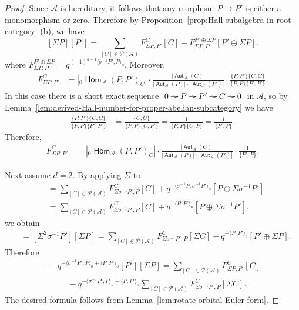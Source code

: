 \documentclass[reqno,12pt,a4paper]{amsart}
\theoremstyle{remark}
\theoremstyle{definition}
\newcommand{\opname}[1]{\operatorname{\mathsf{#1}}}
\newcommand{\Hom}{\opname{Hom}}
\newcommand{\Aut}{\opname{Aut}}
\newcommand{\ca}{{\mathcal A}}
\newcommand{\cp}{{\mathcal P}}
\numberwithin{equation}{section}
\begin{document}
\begin{proof}
Since $\ca$ is hereditary, it follows that any morphism $P\to P'$ is either a monomorphism or zero. Therefore by Proposition~\ref{prop:Hall-subalgebra-in-root-category} (b), we have
\[
[\Sigma P][P']=\sum_{[C]\in\cp(\ca)}F_{\Sigma P,P'}^{C}[C]+F_{\Sigma P,P'}^{P'\oplus\Sigma P}[P'\oplus \Sigma P].
\]
where  $F_{\Sigma P,P'}^{P'\oplus\Sigma P}=q^{(-1)^{d-1}\langle\sigma^{-1}P',P\rangle_o}$. Moreover,
\begin{align*}
F_{\Sigma P,P'}^{C}&=|{}_0\Hom_\ca(P,P')_C|\cdot\frac{|\Aut_\ca(C)|}{|\Aut_\ca(P)|\cdot |\Aut_\ca(P')|}\cdot
\frac{\{P,P'\}\{C,C\}}{\{P,P\}\{P',P'\}}.
\end{align*}
In this case there is a short exact sequence $\xymatrix@C=0.7pc{0\ar[r] &P\ar[r] & P'\ar[r] & C\ar[r] &0}$ in $\ca$, so by Lemma~\ref{lem:derived-Hall-number-for-proper-abelian-subcategory} we have
\begin{align*}
\frac{\{P,P'\}\{C,C\}}{\{P,P\}\{P',P'\}}&=\frac{\{C,C\}}{\{P,P\}\{C,P'\}}=\frac{1}{\{P,P\}\{C,P\}}=\frac{1}{\{P',P\}}.
\end{align*}
Therefore,
\begin{align*}
F_{\Sigma P,P'}^{C}&=|{}_0\Hom_\ca(P,P')_C|\cdot\frac{|\Aut_\ca(C)|}{|\Aut_\ca(P)|\cdot |\Aut_\ca(P')|}\cdot
\frac{1}{\{P',P\}}.
\end{align*}


Next assume $d=2$. By applying $\Sigma$ to
\begin{align*}
[\Sigma \sigma^{-1}P'][P]&=\sum_{[C]\in\cp(\ca)}F_{\Sigma \sigma^{-1}P',P}^C[C]+q^{-\langle\sigma^{-1} P,\sigma^{-1}P'\rangle_o}[P\oplus\Sigma \sigma^{-1}P']\\
&=\sum_{[C]\in\cp(\ca)}F_{\Sigma \sigma^{-1}P',P}^C[C]+q^{-\langle P,P'\rangle_o}[P\oplus\Sigma \sigma^{-1}P'],
\end{align*}
we obtain
\begin{align*}
[P'][\Sigma P]&=[\Sigma^2 \sigma^{-1}P'][\Sigma P]=\sum_{[C]\in\cp(\ca)}F_{\Sigma \sigma^{-1} P',P}^C[\Sigma C]+q^{-\langle P,P'\rangle_o}[P'\oplus\Sigma P].
\end{align*}
Therefore
\begin{align*}
[\Sigma P][P']-&q^{-\langle\sigma^{-1}P',P\rangle_o+\langle P,P'\rangle_o}[P'][\Sigma P]=
\sum_{[C]\in\cp(\ca)}F_{\Sigma P,P'}^C[C]\\
&\hspace{15pt}-q^{-\langle\sigma^{-1}P',P\rangle_o+\langle P,P'\rangle_o}\sum_{[C]\in\cp(\ca)}F_{\Sigma \sigma^{-1}P',P}^C[\Sigma C].
\end{align*}
The desired formula follows from Lemma~\ref{lem:rotate-orbital-Euler-form}.


\end{proof}
\end{document}
